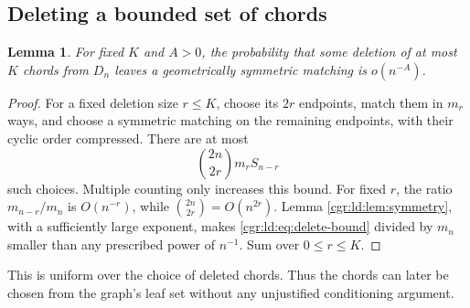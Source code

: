 \documentclass[11pt,letterpaper]{article}
\numberwithin{equation}{section}
\newtheorem{lemma}[theorem]{Lemma}
\theoremstyle{definition}\newtheorem{definition}[theorem]{Definition}
\theoremstyle{remark}\newtheorem{remark}[theorem]{Remark}
\begin{document}
\subsection{Deleting a bounded set of chords}
\begin{lemma}\label{cgr:ld:lem:delete-sym}
For fixed $K$ and $A>0$, the probability that some deletion of at
most $K$ chords from $D_n$ leaves a geometrically symmetric
matching is $o(n^{-A})$.
\end{lemma}
\begin{proof}
For a fixed deletion size $r\le K$, choose its $2r$ endpoints,
match them in $m_r$ ways, and choose a symmetric matching on the
remaining endpoints, with their cyclic order compressed. There
are at most
\begin{equation}\label{cgr:ld:eq:delete-bound}
 \binom{2n}{2r}m_rS_{n-r}
\end{equation}
such choices. Multiple counting only increases this bound. For
fixed $r$, the ratio $m_{n-r}/m_n$ is $O(n^{-r})$, while
$\binom{2n}{2r}=O(n^{2r})$. Lemma \ref{cgr:ld:lem:symmetry}, with a
sufficiently large exponent, makes \eqref{cgr:ld:eq:delete-bound} divided
by $m_n$ smaller than any prescribed power of $n^{-1}$. Sum over
$0\le r\le K$.
\end{proof}
This is uniform over the choice of deleted chords. Thus the
chords can later be chosen from the graph's leaf set without any
unjustified conditioning argument.
\end{document}
